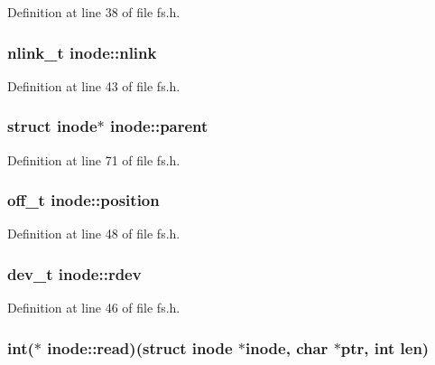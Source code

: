 Definition at line 38 of file fs.\+h.

\hypertarget{structinode_a1daedc820c86b5af32f0a137419f7a8f}{
\subsubsection[{nlink}]{\setlength{\rightskip}{0pt plus 5cm}nlink\+\_\+t inode\+::nlink}}\label{structinode_a1daedc820c86b5af32f0a137419f7a8f}


Definition at line 43 of file fs.\+h.

\hypertarget{structinode_a2d4fac4ae14332628e6fa2bd55dd3121}{
\subsubsection[{parent}]{\setlength{\rightskip}{0pt plus 5cm}struct {\bf inode}$\ast$ inode\+::parent}}\label{structinode_a2d4fac4ae14332628e6fa2bd55dd3121}


Definition at line 71 of file fs.\+h.

\hypertarget{structinode_a5756f61233e40d01652094d29b5daf6c}{
\subsubsection[{position}]{\setlength{\rightskip}{0pt plus 5cm}off\+\_\+t inode\+::position}}\label{structinode_a5756f61233e40d01652094d29b5daf6c}


Definition at line 48 of file fs.\+h.

\hypertarget{structinode_a3e7613383954ff7b5faf7c2188e1f61b}{
\subsubsection[{rdev}]{\setlength{\rightskip}{0pt plus 5cm}dev\+\_\+t inode\+::rdev}}\label{structinode_a3e7613383954ff7b5faf7c2188e1f61b}


Definition at line 46 of file fs.\+h.

\hypertarget{structinode_ae2c5e8a0a372334b97024fbd9ef694c1}{
\subsubsection[{read}]{\setlength{\rightskip}{0pt plus 5cm}int($\ast$ inode\+::read)(struct {\bf inode} $\ast${\bf inode}, char $\ast$ptr, int len)}}\label{structinode_ae2c5e8a0a372334b97024fbd9ef694c1}


